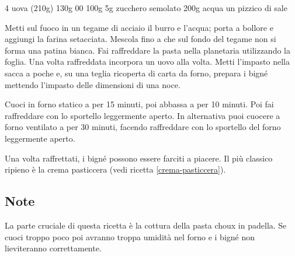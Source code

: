 \begin{ingreds}
	4 uova (210g)
	130g  00
	100g 
	5g zucchero semolato
	200g acqua
	un pizzico di sale


\end{ingreds}

\begin{method}
Metti sul fuoco in un tegame di acciaio il burro e l'acqua; porta a bollore e aggiungi la farina setacciata. Mescola fino a che sul fondo del tegame non si forma una patina bianca.
Fai raffreddare la pasta nella planetaria utilizzando la foglia. Una volta raffreddata incorpora un uovo alla volta.
Metti l'impasto nella sacca a poche e, su una teglia ricoperta di carta da forno, prepara i bigné mettendo l'impasto delle dimensioni di una noce.

	Cuoci in forno statico a  per 15 minuti, poi abbassa a  per 10 minuti. Poi fai raffreddare con lo sportello leggermente aperto.
In alternativa puoi cuocere a forno ventilato a  per 30 minuti, facendo raffreddare con lo sportello del forno leggermente aperto.

	Una volta raffrettati, i bigné possono essere farciti a piacere. Il più classico ripieno è la crema pasticcera (vedi ricetta \ref{crema-pasticcera}).
\end{method}

\subsection*{Note}
	La parte cruciale di questa ricetta è la cottura della pasta choux in padella. Se cuoci troppo poco poi avranno troppa umidità nel forno e i bigné non lieviteranno correttamente.



